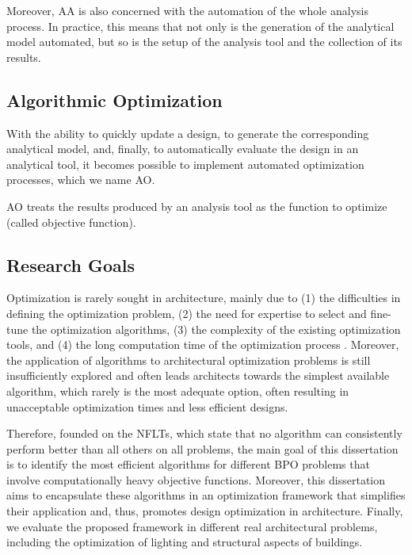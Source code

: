 	Moreover, \ac{AA} is also concerned with the automation of the whole analysis process. In practice, this means that not only is the generation of the analytical model automated, but so is the setup of the analysis tool and the collection of its results.
	
	\subsection{Algorithmic Optimization}
	With the ability to quickly update a design, to generate the corresponding analytical model, and, finally, to automatically evaluate the design in an analytical tool, it becomes possible to implement automated optimization processes, which we name \ac{AO}.
	
	\ac{AO} treats the results produced by an analysis tool as the function to optimize (called objective function). 
	
	\subsection{Research Goals}
	 
	Optimization is rarely sought in architecture, mainly due to (1) the difficulties in defining the optimization problem, (2) the need for expertise to select and fine-tune the optimization algorithms, (3) the complexity of the existing optimization tools, and (4) the long computation time of the optimization process \cite{Attia2013}. Moreover, the application of algorithms to architectural optimization problems is still insufficiently explored and often leads architects towards the simplest available algorithm, which rarely is the most adequate option, often resulting in unacceptable optimization times and less efficient designs.

	Therefore, founded on the \acp{NFLT}, which state that no algorithm can consistently perform better than all others on all problems, the main goal of this dissertation is to identify the most efficient algorithms for different \ac{BPO} problems that involve computationally heavy objective functions. Moreover, this dissertation aims to encapsulate these algorithms in an optimization framework that simplifies their application and, thus, promotes design optimization in architecture. Finally, we evaluate the proposed framework in different real architectural problems, including the optimization of lighting and structural aspects of buildings. 
	